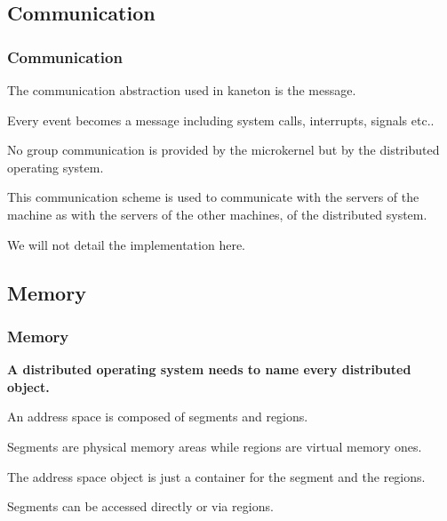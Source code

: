 %
%

\subsection{Communication}


\begin{frame}
  \frametitle{Communication}

  The communication abstraction used in kaneton is the message.

  \nl

  Every event becomes a message including system calls, interrupts,
  signals etc..

  \nl

  No group communication is provided by the microkernel but by the distributed
  operating system.

  \nl

  This communication scheme is used to communicate with the servers
  of the machine as with the servers of the other machines, of
  the distributed system.

  \nl

  We will not detail the implementation here.
\end{frame}

%
%

\subsection{Memory}


\begin{frame}
  \frametitle{Memory}

  \textbf{A distributed operating system needs to name every
    distributed object.}

  \nl

  An address space is composed of segments and regions.

  \nl

  Segments are physical memory areas while regions are virtual memory
  ones.

  \nl

  The address space object is just a container for the segment and
  the regions.

  \nl

  Segments can be accessed directly or via regions.
\end{frame}

%
%

